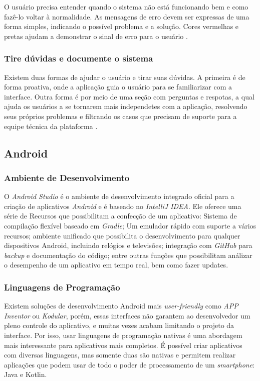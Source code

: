 O usuário precisa entender quando o sistema não está funcionando bem e como fazê-lo voltar à normalidade. As mensagens de erro devem ser expressas de uma forma simples, indicando o possível problema e a solução. 
Cores vermelhas e pretas ajudam a demonstrar o sinal de erro para o usuário \cite{site:nielsenError}.

\subsubsection{Tire dúvidas e documente o sistema}

Existem duas formas de ajudar o usuário e tirar suas dúvidas. A primeira é de forma proativa, onde a aplicação guia o usuário para se familiarizar com a interface. Outra forma é por meio de uma seção com perguntas e respotas, a qual ajuda os usuários a se tornarem mais independetes com a aplicação, resolvendo seus próprios problemas e filtrando os casos que precisam de suporte para a equipe técnica da plataforma \cite{site:nielsenHelpandDoc}.

\subsection{Android}
\subsubsection{Ambiente de Desenvolvimento}

O \textit{Android Studio} é o ambiente de desenvolvimento integrado oficial para a criação de aplicativos \textit{Android} e é baseado no \textit{IntelliJ IDEA}. Ele oferece uma série de Recursos que possibilitam a confecção de um aplicativo: Sistema de compilação flexível baseado em \textit{Gradle}; Um emulador rápido com suporte a vários recursos; ambiente unificado que possibilita o desenvolvimento para qualquer dispositivos Android, incluindo relógios e televisões; integração com \textit{GitHub} para \textit{backup} e documentação do código; entre outras funções que possibilitam análizar o desempenho de um aplicativo em tempo real, bem como fazer updates. \cite{site:androidstudio}

\subsubsection{Linguagens de Programação}

Existem soluções de desenvolvimento Android mais \textit{user-friendly} como \textit{APP Inventor} ou \textit{Kodular}, porém, essas interfaces não garantem ao desenvolvedor um pleno controle do aplicativo, e muitas vezes acabam limitando o projeto da interface. Por isso, usar linguagens de programação nativas é uma abordagem mais interessante para aplicativos mais completos. É possível criar aplicativos com diversas linguagens, mas somente duas são nativas e permitem realizar aplicações que podem usar de todo o poder de processamento de um \textit{smartphone}: Java e Kotlin.

